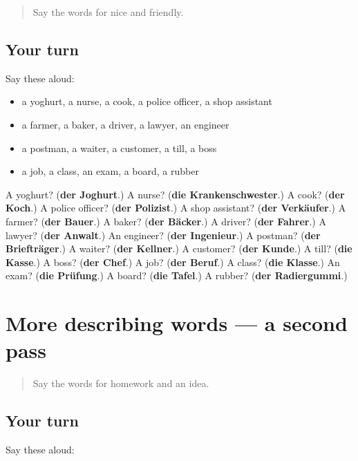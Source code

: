 \begin{quote}
Say the words for nice and friendly.
\end{quote}

\subsection*{Your turn}
Say these aloud:

\begin{itemize}
\raggedright
  \item a yoghurt, a nurse, a cook, a police officer, a shop assistant
  \item a farmer, a baker, a driver, a lawyer, an engineer
  \item a postman, a waiter, a customer, a till, a boss
  \item a job, a class, an exam, a board, a rubber
\end{itemize}

\begin{tcolorbox}[breakable,colback=teal!4,colframe=teal!35!black,title={Before you move on}]
A yoghurt? (\textbf{der Joghurt}.) A nurse? (\textbf{die Krankenschwester}.) A cook? (\textbf{der Koch}.) A police officer? (\textbf{der Polizist}.) A shop assistant? (\textbf{der Verkäufer}.) A farmer? (\textbf{der Bauer}.) A baker? (\textbf{der Bäcker}.) A driver? (\textbf{der Fahrer}.) A lawyer? (\textbf{der Anwalt}.) An engineer? (\textbf{der Ingenieur}.) A postman? (\textbf{der Briefträger}.) A waiter? (\textbf{der Kellner}.) A customer? (\textbf{der Kunde}.) A till? (\textbf{die Kasse}.) A boss? (\textbf{der Chef}.) A job? (\textbf{der Beruf}.) A class? (\textbf{die Klasse}.) An exam? (\textbf{die Prüfung}.) A board? (\textbf{die Tafel}.) A rubber? (\textbf{der Radiergummi}.)
\end{tcolorbox}
\section[(dialogue)]{More describing words — a second pass}

\label{lesson:GE-R132-second-pass-more-describing-words}



\begin{quote}
Say the words for homework and an idea.
\end{quote}

\subsection*{Your turn}
Say these aloud:

